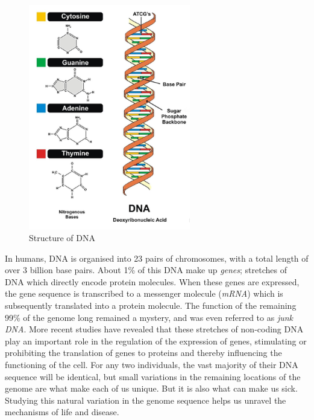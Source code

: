 \begin{figure}
    \centering
    \includegraphics[width=200pt]{chapters/images/introduction/dna-structure.png}
    \caption{Structure of DNA}
    \label{fig:dnastructure}
\end{figure}

In humans, DNA is organised into 23 pairs of chromosomes, with a total length of over 3 billion base pairs. About 1\% of this DNA make up \emph{genes}; stretches of DNA which directly encode protein molecules. When these genes are expressed, the gene sequence is transcribed to a messenger molecule (\emph{mRNA}) which is subsequently translated into a protein molecule. The function of the remaining 99\% of the genome long remained a mystery, and was even referred to as \emph{junk DNA}. More recent studies have revealed that these stretches of non-coding DNA play an important role in the regulation of the expression of genes, stimulating or prohibiting the translation of genes to proteins and thereby influencing the functioning of the cell. For any two individuals, the vast majority of their DNA sequence will be identical, but small variations in the remaining locations of the genome are what make each of us unique. But it is also what can make us sick. Studying this natural variation in the genome sequence helps us unravel the mechanisms of life and disease.


